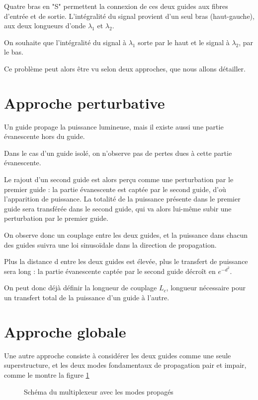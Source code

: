 \documentclass[a4paper,11pt]{report}
\begin{document}
Quatre bras en "S" permettent la connexion de ces deux guides aux fibres d'entrée et de sortie.
L'intégralité du signal provient d'un seul bras (haut-gauche), aux deux longueurs d'onde $\lambda_1$ et $\lambda_2$.

On souhaite que l'intégralité du signal à $\lambda_1$ sorte par le haut et le signal à $\lambda_2$, par le bas.

Ce problème peut alors être vu selon deux approches, que nous allons détailler.

\section{Approche perturbative}
Un guide propage la puissance lumineuse, mais il existe aussi une partie évanescente hors du guide.

Dans le cas d'un guide isolé, on n'observe pas de pertes dues à cette partie évanescente.

Le rajout d'un second guide est alors perçu comme une perturbation par le premier guide : la partie évanescente est captée par le second guide, d'où l'apparition de puissance. La totalité de la puissance présente dans le premier guide sera transférée dans le second guide, qui va alors lui-même subir une perturbation par le premier guide.

On observe donc un couplage entre les deux guides, et la puissance dans chacun des guides suivra une loi sinusoïdale dans la direction de propagation.

Plus la distance d entre les deux guides est élevée, plus le transfert de puissance sera long : la partie évanescente captée par le second guide décroît en $e^{-d^2}$.

On peut donc déjà définir la longueur de couplage $L_c$, longueur nécessaire pour un transfert total de la puissance d'un guide à l'autre.

\section{Approche globale}%
Une autre approche consiste à considérer les deux guides comme une seule superstructure, et les deux modes fondamentaux de propagation pair et impair, comme le montre la figure \ref{schema_modes}
\begin{figure}[H]
    \begin{center}
        
        \caption{Schéma du multiplexeur avec les modes propagés}
        \label{schema_modes}
    \end{center}
\end{figure}
\end{document}
